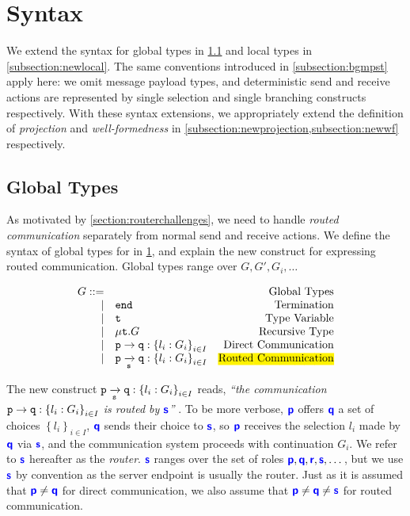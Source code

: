 \section{Syntax}
\label{section:syntax}

We extend the syntax for global types
in \cref{subsection:newglobal} and
local types in \cref{subsection:newlocal}.
The same conventions introduced in \cref{subsection:bgmpst}
apply here: 
we omit message payload types,
and deterministic send and receive actions
are represented by single selection and
single branching constructs respectively.
With these syntax extensions, we appropriately extend
the definition of \textit{projection} and 
\textit{well-formedness} in 
\cref{subsection:newprojection,subsection:newwf}
respectively.

\subsection{Global Types}
\label{subsection:newglobal}

As motivated by \cref{section:routerchallenges},
we need to handle \textit{routed communication} separately
from normal send and receive actions.
We define the syntax of global types for \newtheory 
in \cref{fig:newsyntaxglobal}, and explain the 
new construct for expressing routed communication.
Global types range over $G, G', G_i, \dots$

\begin{figure}[!h]
\doublespacing
\[
\begin{array}{rlr}
G ::= & & \text{Global Types} \\
\mid & \tend & \text{Termination} \\
\mid & \trecvar & \text{Type Variable} \\
\mid & \trec{G} & \text{Recursive Type} \\
\mid & \gcomm{p}{q}{l_i: G_i}{i \in I} & \text{Direct Communication} \\
\mid & \groute{p}{q}{s}{l_i: G_i}{i \in I}
	& \text{\hl{Routed Communication}} \\
\end{array}
\]
\singlespacing
{}
\label{fig:newsyntaxglobal}
\end{figure}

The new construct $\groute{p}{q}{s}{l_i: G_i}{i \in I}$ reads, 
\textit{
``the communication $\gcomm{p}{q}{l_i: G_i}{i \in I}$
is routed by $\role{s}$''
}.
To be more verbose,
$\role{p}$ offers $\role{q}$ a set of choices
$\left\{l_i\right\}_{i \in I}$,
$\role{q}$ sends their choice to
$\role{s}$, so $\role{p}$ receives the
selection $l_i$ made by $\role{q}$ via $\role{s}$,
and the communication system proceeds with continuation $G_i$.
We refer to $\role{s}$ hereafter as the \textit{router}.
$\role{s}$ ranges over the set of roles 
$\role{p},\role{q},\role{r},\role{s},\dots$,
but we use $\role{s}$ by convention as the server endpoint
is usually the router.
Just as it is assumed that $\role{p} \neq \role{q}$ for
direct communication,
we also assume that
$\role{p} \neq \role{q} \neq \role{s}$ for routed communication.

